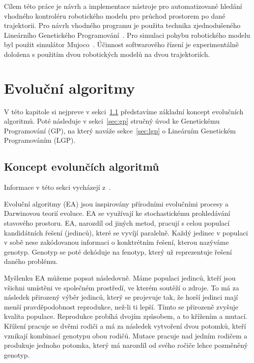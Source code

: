 Cílem této práce je návrh a implementace nástroje pro automatizované hledání vhodného kontroléru robotického modelu pro průchod prostorem po dané trajektorii.
Pro návrh vhodného programu je použita technika zjednodušeného Lineárního Genetického Programování~\cite{Brameier2010}.
Pro simulaci pohybu robotického modelu byl použit simulátor Mujoco~\cite{Todorov2012}.
Účinnost softwarového řízení je experimentálně doložena s použitím dvou robotických modelů na dvou trajektoriích.



\chapter{Evoluční algoritmy}
V této kapitole si nejpreve v sekci~\ref{sec:koncept_ea} představíme základní koncept evolučních algoritmů.
Poté následuje v sekci~\ref{sec:gp} stručný úvod ke Genetickému Programování (GP), na který naváže sekce~\ref{sec:lgp} o Lineárním Genetickém Programováním (LGP).

\section{Koncept evolunčích algoritmů}
\label{sec:koncept_ea}
Informace v této sekci vycházejí z~\cite{Eiben2015}.

Evoluční algoritmy (EA) jsou inspirovány přírodními evolučními procesy a Darwinovou teorií evoluce.
EA se využívají ke stochastickému prohledávání stavového prostoru.
EA, narozdíl od jiných metod, pracují s celou populací kandidátních řešení (jedinců), které se vyvíjí paralelně.
Každý jedinec v populaci v sobě nese zakódovanou informaci o konktrétním řešení, kterou nazýváme genotyp.
Genotyp se poté dekóduje na fenotyp, který už reprezentuje řešení daného problému.

Myšlenku EA můžeme popsat následovně.
Máme populaci jedinců, kteří jsou všichni umístěni ve společném prostředí, ve kterém soutěží o zdroje.
To má za následek přirozený výběr jedinců, který se projevuje tak, že horší jedinci mají menší pravděpodobnost reprodukce, než-li ti lepší.
Tímto se přirozeně zvyšuje kvalita populace.
Reprodukce probíhá dvojím způsobem, a to křížením a mutací.
Křížení pracuje se dvěmi rodiči a má za následek vytvoření dvou potomků, kteří vznikají kombinací genotypu obou rodičů.
Mutace pracuje nad jedním rodičem a produkuje jednoho potomka, který má narozdíl od svého ročiče lehce pozměněný genotyp.

